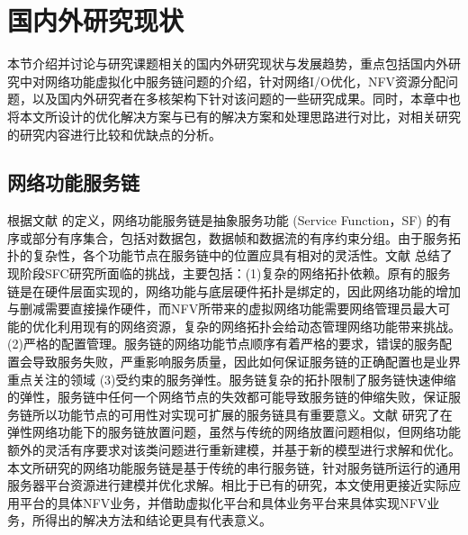 \section{国内外研究现状}
\label{intro:research}
本节介绍并讨论与研究课题相关的国内外研究现状与发展趋势，重点包括国内外研究中对网络功能虚拟化中服务链问题的介绍，针对网络I/O优化，NFV资源分配问题，以及国内外研究者在多核架构下针对该问题的一些研究成果。同时，本章中也将本文所设计的优化解决方案与已有的解决方案和处理思路进行对比，对相关研究的研究内容进行比较和优缺点的分析。

\subsection{网络功能服务链}
根据文献  的定义，网络功能服务链是抽象服务功能 (Service Function，SF) 的有序或部分有序集合，包括对数据包，数据帧和数据流的有序约束分组。由于服务拓扑的复杂性，各个功能节点在服务链中的位置应具有相对的灵活性。文献  总结了现阶段SFC研究所面临的挑战，主要包括：(1)复杂的网络拓扑依赖。原有的服务链是在硬件层面实现的，网络功能与底层硬件拓扑是绑定的，因此网络功能的增加与删减需要直接操作硬件，而NFV所带来的虚拟网络功能需要网络管理员最大可能的优化利用现有的网络资源，复杂的网络拓扑会给动态管理网络功能带来挑战。(2)严格的配置管理。服务链的网络功能节点顺序有着严格的要求，错误的服务配置会导致服务失败，严重影响服务质量，因此如何保证服务链的正确配置也是业界重点关注的领域 (3)受约束的服务弹性。服务链复杂的拓扑限制了服务链快速伸缩的弹性，服务链中任何一个网络节点的失效都可能导致服务链的伸缩失败，保证服务链所以功能节点的可用性对实现可扩展的服务链具有重要意义。文献  研究了在弹性网络功能下的服务链放置问题，虽然与传统的网络放置问题相似，但网络功能额外的灵活有序要求对该类问题进行重新建模，并基于新的模型进行求解和优化。本文所研究的网络功能服务链是基于传统的串行服务链，针对服务链所运行的通用服务器平台资源进行建模并优化求解。相比于已有的研究，本文使用更接近实际应用平台的具体NFV业务，并借助虚拟化平台和具体业务平台来具体实现NFV业务，所得出的解决方法和结论更具有代表意义。

